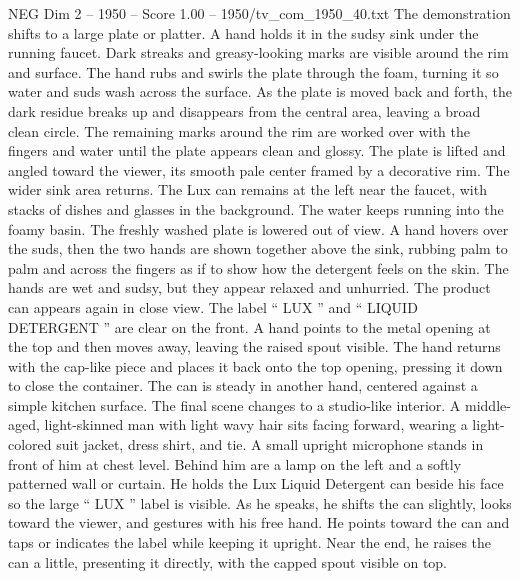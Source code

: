 \begin{textsample}{NEG Dim 2 – 1950 – Score 1.00 – 1950/tv\_com\_1950\_40.txt}
The demonstration shifts to a large plate or platter.
A hand holds it in the sudsy sink under the running faucet.
Dark streaks and greasy-looking marks are visible around the rim and surface.
The hand rubs and swirls the plate through the foam, turning it so water and suds wash across the surface.
As the plate is moved back and forth, the dark residue breaks up and disappears from the central area, leaving a broad clean circle.
The remaining marks around the rim are worked over with the fingers and water until the plate appears clean and glossy.
The plate is lifted and angled toward the viewer, its smooth pale center framed by a decorative rim.
The wider sink area returns.
The Lux can remains at the left near the faucet, with stacks of dishes and glasses in the background.
The water keeps running into the foamy basin.
The freshly washed plate is lowered out of view.
A hand hovers over the suds, then the two hands are shown together above the sink, rubbing palm to palm and across the fingers as if to show how the detergent feels on the skin.
The hands are wet and sudsy, but they appear relaxed and unhurried.
The product can appears again in close view.
The label “ LUX ” and “ LIQUID DETERGENT ” are clear on the front.
A hand points to the metal opening at the top and then moves away, leaving the raised spout visible.
The hand returns with the cap-like piece and places it back onto the top opening, pressing it down to close the container.
The can is steady in another hand, centered against a simple kitchen surface.
The final scene changes to a studio-like interior.
A middle-aged, light-skinned man with light wavy hair sits facing forward, wearing a light-colored suit jacket, dress shirt, and tie.
A small upright microphone stands in front of him at chest level.
Behind him are a lamp on the left and a softly patterned wall or curtain.
He holds the Lux Liquid Detergent can beside his face so the large “ LUX ” label is visible.
As he speaks, he shifts the can slightly, looks toward the viewer, and gestures with his free hand.
He points toward the can and taps or indicates the label while keeping it upright.
Near the end, he raises the can a little, presenting it directly, with the capped spout visible on top.

\end{textsample}
